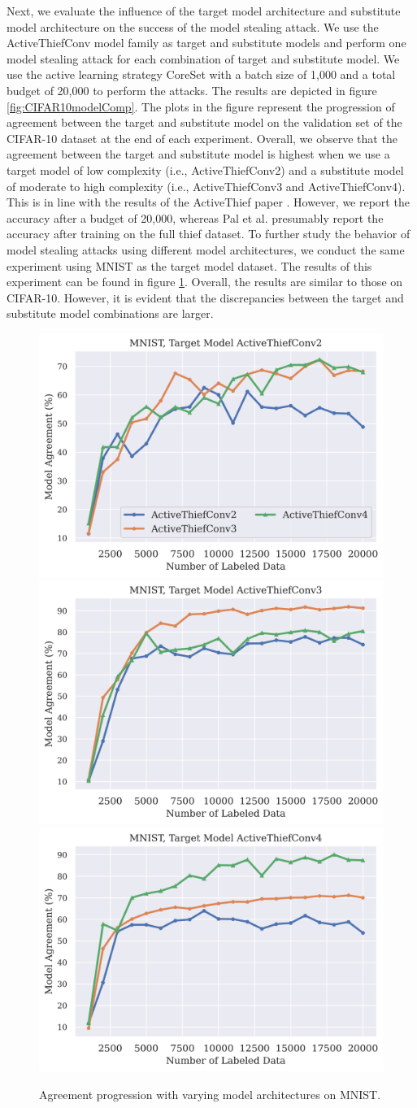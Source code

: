 Next, we evaluate the influence of the target model architecture and substitute model architecture on the success of the model stealing attack. We use the ActiveThiefConv model
family as target and substitute models and perform one model stealing attack for each combination of target and substitute model. We use the active learning strategy CoreSet
with a batch size of 1,000 and a total budget of 20,000 to perform the attacks. The results are depicted in figure \ref{fig:CIFAR10modelComp}. The plots in the figure represent
the progression of agreement between the target and substitute model on the validation set of the CIFAR-10 dataset at the end of each experiment. Overall, we observe that the
agreement between the target and substitute model is highest when we use a target model of low complexity (i.e., ActiveThiefConv2) and a substitute model of moderate to high
complexity (i.e., ActiveThiefConv3 and ActiveThiefConv4). This is in line with the results of the ActiveThief paper \cite{pal2020activethief}. However, we report the accuracy
after a budget of 20,000, whereas Pal et al. presumably report the accuracy after training on the full thief dataset. To further study the behavior of model stealing attacks
using different model architectures, we conduct the same experiment using MNIST as the target model dataset. The results of this experiment can be found in figure 
\ref{fig:MNISTmodelComp}. Overall, the results are similar to those on CIFAR-10. However, it is evident that the discrepancies between
the target and substitute model combinations are larger. \par

\begin{figure}[!htb]
    \centering
    \includegraphics[width=0.32\linewidth]{images/MSInsights/mnist_act2.png} \hfill
    \includegraphics[width=0.32\linewidth]{images/MSInsights/mnist_act3.png} \hfill
    \includegraphics[width=0.32\linewidth]{images/MSInsights/mnist_act4.png}
    \caption{Agreement progression with varying model architectures on MNIST.}
    \label{fig:MNISTmodelComp}
\end{figure}

